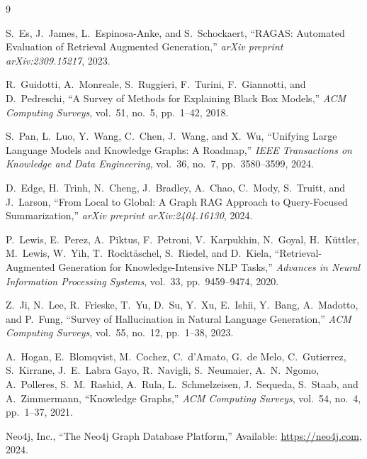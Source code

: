 \begin{thebibliography}{9}

S.~Es, J.~James, L.~Espinosa-Anke, and S.~Schockaert,
``RAGAS: Automated Evaluation of Retrieval Augmented Generation,''
\textit{arXiv preprint arXiv:2309.15217}, 2023.

R.~Guidotti, A.~Monreale, S.~Ruggieri, F.~Turini, F.~Giannotti, and D.~Pedreschi,
``A Survey of Methods for Explaining Black Box Models,''
\textit{ACM Computing Surveys}, vol.~51, no.~5, pp.~1--42, 2018.

S.~Pan, L.~Luo, Y.~Wang, C.~Chen, J.~Wang, and X.~Wu,
``Unifying Large Language Models and Knowledge Graphs: A Roadmap,''
\textit{IEEE Transactions on Knowledge and Data Engineering}, vol.~36, no.~7, pp.~3580--3599, 2024.

D.~Edge, H.~Trinh, N.~Cheng, J.~Bradley, A.~Chao, C.~Mody, S.~Truitt, and J.~Larson,
``From Local to Global: A Graph RAG Approach to Query-Focused Summarization,''
\textit{arXiv preprint arXiv:2404.16130}, 2024.

P.~Lewis, E.~Perez, A.~Piktus, F.~Petroni, V.~Karpukhin, N.~Goyal, H.~K\"{u}ttler, M.~Lewis, W.~Yih, T.~Rockt\"{a}schel, S.~Riedel, and D.~Kiela,
``Retrieval-Augmented Generation for Knowledge-Intensive NLP Tasks,''
\textit{Advances in Neural Information Processing Systems}, vol.~33, pp.~9459--9474, 2020.

Z.~Ji, N.~Lee, R.~Frieske, T.~Yu, D.~Su, Y.~Xu, E.~Ishii, Y.~Bang, A.~Madotto, and P.~Fung,
``Survey of Hallucination in Natural Language Generation,''
\textit{ACM Computing Surveys}, vol.~55, no.~12, pp.~1--38, 2023.

A.~Hogan, E.~Blomqvist, M.~Cochez, C.~d'Amato, G.~de Melo, C.~Gutierrez, S.~Kirrane, J.~E.~Labra Gayo, R.~Navigli, S.~Neumaier, A.~N.~Ngomo, A.~Polleres, S.~M.~Rashid, A.~Rula, L.~Schmelzeisen, J.~Sequeda, S.~Staab, and A.~Zimmermann,
``Knowledge Graphs,''
\textit{ACM Computing Surveys}, vol.~54, no.~4, pp.~1--37, 2021.

Neo4j, Inc.,
``The Neo4j Graph Database Platform,''
Available: \url{https://neo4j.com}, 2024.

\end{thebibliography}
